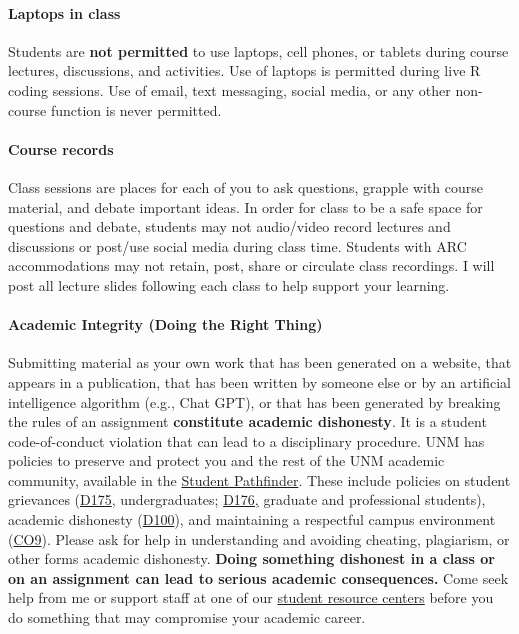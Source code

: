 \documentclass[11pt]{article}
\begin{document}
\paragraph{Laptops in class} Students are \textbf{not permitted} to use laptops, cell phones, or tablets during course lectures, discussions, and activities. Use of laptops is permitted during live R coding sessions.
Use of email, text messaging, social media, or any other non-course function is never permitted.

\paragraph{Course records} Class sessions are places for each of you to ask questions, grapple with course material, and debate important ideas. In order for class to be a safe space for questions and debate, students may not audio/video record lectures and discussions or post/use social media during class time. Students with ARC accommodations may not retain, post, share or circulate class recordings. I will post all lecture slides following each class to help support your learning. \vspace{-5pt}

\paragraph{Academic Integrity (Doing the Right Thing)} Submitting material as your own work that has been generated on a website, that appears in a publication, that has been written by someone else or by an artificial intelligence algorithm (e.g., Chat GPT), or that has been generated by breaking the rules of an assignment \textbf{constitute academic dishonesty}. It is a student code-of-conduct violation that can lead to a disciplinary procedure. UNM has policies to preserve and protect you and the rest of the UNM academic community, available in the \href{https://pathfinder.unm.edu/}{Student Pathfinder}. These include policies on student grievances (\href{https://handbook.unm.edu/d175/}{D175}, undergraduates; \href{https://handbook.unm.edu/d176/}{D176,} graduate and professional students), academic dishonesty (\href{https://handbook.unm.edu/d100/}{D100}), and maintaining a respectful campus environment (\href{https://handbook.unm.edu/c09/}{CO9}). Please ask for help in understanding and avoiding cheating, plagiarism, or other forms academic dishonesty. \textbf{Doing something dishonest in a class or on an assignment can lead to serious academic consequences.} Come seek help from me or support staff at one of our \href{https://students.unm.edu/find-your-pack/resource-centers.html}{student resource centers} before you do something that may compromise your academic career.
 \vspace{-5pt}
\end{document}
